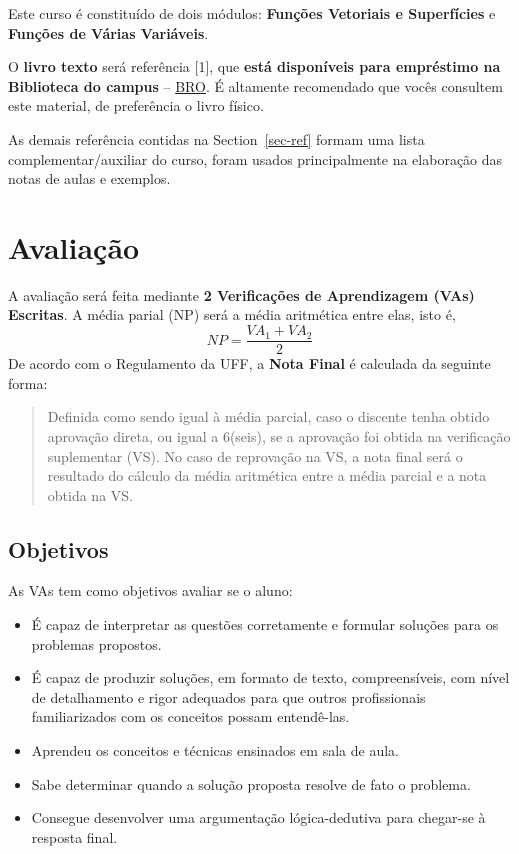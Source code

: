 \documentclass[
  letterpaper,
  DIV=11,
  numbers=noendperiod]{scrartcl}
\providecommand{\tightlist}{%
  \setlength{\itemsep}{0pt}\setlength{\parskip}{0pt}}
\begin{document}
Este curso é constituído de dois módulos: \textbf{Funções Vetoriais e
Superfícies} e \textbf{Funções de Várias Variáveis}.

O \textbf{livro texto} será referência {[}1{]}, que \textbf{está
disponíveis para empréstimo na Biblioteca do campus} --
\href{https://bibliotecas.uff.br/bro/}{BRO}. É altamente recomendado que
vocês consultem este material, de preferência o livro físico.

As demais referência contidas na Section~\ref{sec-ref} formam uma lista
complementar/auxiliar do curso, foram usados principalmente na
elaboração das notas de aulas e exemplos.

\section{Avaliação}\label{avaliauxe7uxe3o}

A avaliação será feita mediante \textbf{2 Verificações de Aprendizagem
(VAs) Escritas}. A média parial (NP) será a média aritmética entre elas,
isto é, \[NP=\frac{VA_1+VA_2}{2}\] De acordo com o Regulamento da UFF, a
\textbf{Nota Final} é calculada da seguinte forma:

\begin{quote}
Definida como sendo igual à média parcial, caso o discente tenha obtido
aprovação direta, ou igual a 6(seis), se a aprovação foi obtida na
verificação suplementar (VS). No caso de reprovação na VS, a nota final
será o resultado do cálculo da média aritmética entre a média parcial e
a nota obtida na VS.
\end{quote}

\subsection*{Objetivos}\label{objetivos}

As VAs tem como objetivos avaliar se o aluno:

\begin{itemize}
\tightlist
\item
  É capaz de interpretar as questões corretamente e formular soluções
  para os problemas propostos.
\item
  É capaz de produzir soluções, em formato de texto, compreensíveis, com
  nível de detalhamento e rigor adequados para que outros profissionais
  familiarizados com os conceitos possam entendê-las.
\item
  Aprendeu os conceitos e técnicas ensinados em sala de aula.
\item
  Sabe determinar quando a solução proposta resolve de fato o problema.
\item
  Consegue desenvolver uma argumentação lógica-dedutiva para chegar-se à
  resposta final.
\end{itemize}
\end{document}
